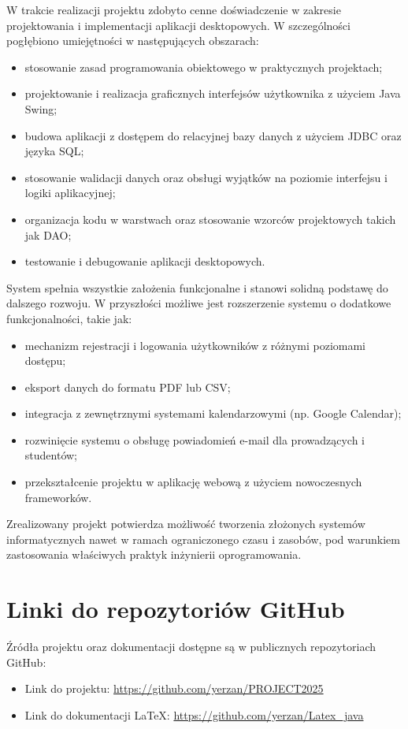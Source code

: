 W trakcie realizacji projektu zdobyto cenne doświadczenie w zakresie projektowania i implementacji aplikacji desktopowych. W szczególności pogłębiono umiejętności w następujących obszarach:

\begin{itemize}
    \item stosowanie zasad programowania obiektowego w praktycznych projektach;
    \item projektowanie i realizacja graficznych interfejsów użytkownika z użyciem Java Swing;
    \item budowa aplikacji z dostępem do relacyjnej bazy danych z użyciem JDBC oraz języka SQL;
    \item stosowanie walidacji danych oraz obsługi wyjątków na poziomie interfejsu i logiki aplikacyjnej;
    \item organizacja kodu w warstwach oraz stosowanie wzorców projektowych takich jak DAO;
    \item testowanie i debugowanie aplikacji desktopowych.
\end{itemize}

System spełnia wszystkie założenia funkcjonalne i stanowi solidną podstawę do dalszego rozwoju. W przyszłości możliwe jest rozszerzenie systemu o dodatkowe funkcjonalności, takie jak:

\begin{itemize}
    \item mechanizm rejestracji i logowania użytkowników z różnymi poziomami dostępu;
    \item eksport danych do formatu PDF lub CSV;
    \item integracja z zewnętrznymi systemami kalendarzowymi (np. Google Calendar);
    \item rozwinięcie systemu o obsługę powiadomień e-mail dla prowadzących i studentów;
    \item przekształcenie projektu w aplikację webową z użyciem nowoczesnych frameworków.
\end{itemize}

Zrealizowany projekt potwierdza możliwość tworzenia złożonych systemów informatycznych nawet w ramach ograniczonego czasu i zasobów, pod warunkiem zastosowania właściwych praktyk inżynierii oprogramowania.

\section{Linki do repozytoriów GitHub}

Źródła projektu oraz dokumentacji dostępne są w publicznych repozytoriach GitHub:

\begin{itemize}
    \item Link do projektu: \url{https://github.com/yerzan/PROJECT2025}
    \item Link do dokumentacji \LaTeX{}: \url{https://github.com/yerzan/Latex_java}
\end{itemize}
